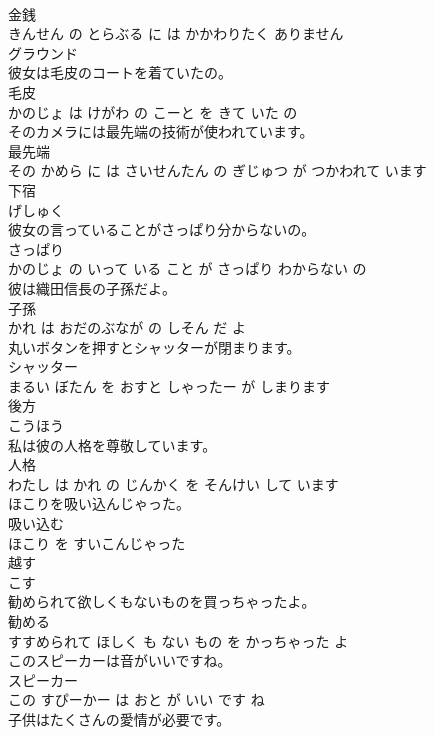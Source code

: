 \documentclass[8pt]{extreport}
\begin{document}
\begin{CJK}{UTF8}{min}
\\	金銭 
\\	きんせん の とらぶる に は かかわりたく ありません			
\\	グラウンド	
\\	彼女は毛皮のコートを着ていたの。	
\\	毛皮 
\\	かのじょ は けがわ の こーと を きて いた の			
\\	そのカメラには最先端の技術が使われています。	
\\	最先端 
\\	その かめら に は さいせんたん の ぎじゅつ が つかわれて います			
\\	下宿	
\\	げしゅく			
\\	彼女の言っていることがさっぱり分からないの。	
\\	さっぱり 
\\	かのじょ の いって いる こと が さっぱり わからない の			
\\	彼は織田信長の子孫だよ。	
\\	子孫 
\\	かれ は おだのぶなが の しそん だ よ			
\\	丸いボタンを押すとシャッターが閉まります。	
\\	シャッター 
\\	まるい ぼたん を おすと しゃったー が しまります			
\\	後方	
\\	こうほう			
\\	私は彼の人格を尊敬しています。	
\\	人格 
\\	わたし は かれ の じんかく を そんけい して います			
\\	ほこりを吸い込んじゃった。	
\\	吸い込む 
\\	ほこり を すいこんじゃった			
\\	越す	
\\	こす			
\\	勧められて欲しくもないものを買っちゃったよ。	
\\	勧める 
\\	すすめられて ほしく も ない もの を かっちゃった よ			
\\	このスピーカーは音がいいですね。	
\\	スピーカー 
\\	この すぴーかー は おと が いい です ね			
\\	子供はたくさんの愛情が必要です。	

\end{CJK}
\end{document}

